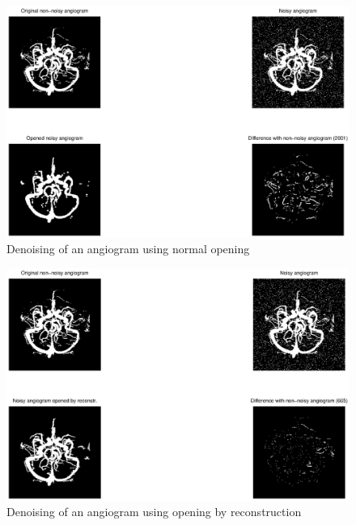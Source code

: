 \begin{figure}[htb]
 \centering
 \includegraphics[width=\linewidth]{angio_open.eps}
 \caption{Denoising of an angiogram using normal opening}
 \label{fig:angio_open}
\end{figure}
\begin{figure}[htb]
 \centering
 \includegraphics[width=\linewidth]{angio_open_recon.eps}
 \caption{Denoising of an angiogram using opening by reconstruction}
 \label{fig:angio_open_recon}
\end{figure}
\clearpage